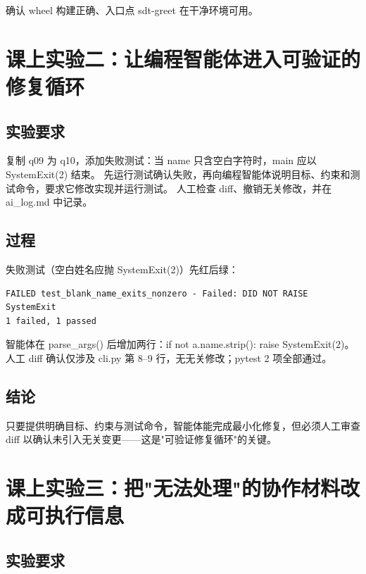 \documentclass[UTF8]{ctexart}
\begin{document}
确认 wheel 构建正确、入口点 sdt-greet 在干净环境可用。


\section{课上实验二：让编程智能体进入可验证的修复循环}

\subsection{实验要求}

复制 q09 为 q10，添加失败测试：当 name 只含空白字符时，main 应以 SystemExit(2) 结束。
先运行测试确认失败，再向编程智能体说明目标、约束和测试命令，要求它修改实现并运行测试。
人工检查 diff、撤销无关修改，并在 ai\_log.md 中记录。

\subsection{过程}

失败测试（空白姓名应抛 SystemExit(2)）先红后绿：

\begin{lstlisting}
FAILED test_blank_name_exits_nonzero - Failed: DID NOT RAISE SystemExit
1 failed, 1 passed
\end{lstlisting}

智能体在 parse\_args() 后增加两行：if not a.name.strip(): raise SystemExit(2)。
人工 diff 确认仅涉及 cli.py 第 8--9 行，无无关修改；pytest 2 项全部通过。

\subsection{结论}

只要提供明确目标、约束与测试命令，智能体能完成最小化修复，但必须人工审查 diff
以确认未引入无关变更——这是"可验证修复循环"的关键。


\section{课上实验三：把"无法处理"的协作材料改成可执行信息}

\subsection{实验要求}
\end{document}
